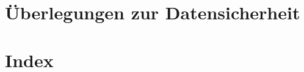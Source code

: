 \documentclass[paper=a4,BCOR8.25mm,twoside]{scrbook}
\begin{document}


%    
\chapter{Überlegungen zur Datensicherheit}	
	

\chapter{Index}
\printindex
\end{document}
